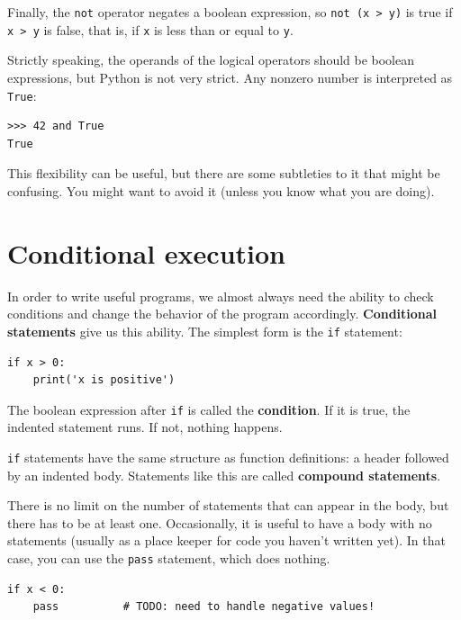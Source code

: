 \documentclass[10pt]{book}
\begin{document}
Finally, the {\tt not} operator negates a boolean
expression, so {\tt not (x > y)} is true if {\tt x > y} is false,
that is, if {\tt x} is less than or equal to {\tt y}.

Strictly speaking, the operands of the logical operators should be
boolean expressions, but Python is not very strict.
Any nonzero number is interpreted as {\tt True}:

\begin{verbatim}
>>> 42 and True
True
\end{verbatim}
%
This flexibility can be useful, but there are some subtleties to
it that might be confusing.  You might want to avoid it (unless
you know what you are doing).


\section{Conditional execution}
\label{conditional.execution}

In order to write useful programs, we almost always need the ability
to check conditions and change the behavior of the program
accordingly.  {\bf Conditional statements} give us this ability.  The
simplest form is the {\tt if} statement:

\begin{verbatim}
if x > 0:
    print('x is positive')
\end{verbatim}
%
The boolean expression after {\tt if} is
called the {\bf condition}.  If it is true, the indented
statement runs.  If not, nothing happens.

{\tt if} statements have the same structure as function definitions:
a header followed by an indented body.  Statements like this are
called {\bf compound statements}.

There is no limit on the number of statements that can appear in
the body, but there has to be at least one.
Occasionally, it is useful to have a body with no statements (usually
as a place keeper for code you haven't written yet).  In that
case, you can use the {\tt pass} statement, which does nothing.

\begin{verbatim}
if x < 0:
    pass          # TODO: need to handle negative values!
\end{verbatim}
%
\end{document}
